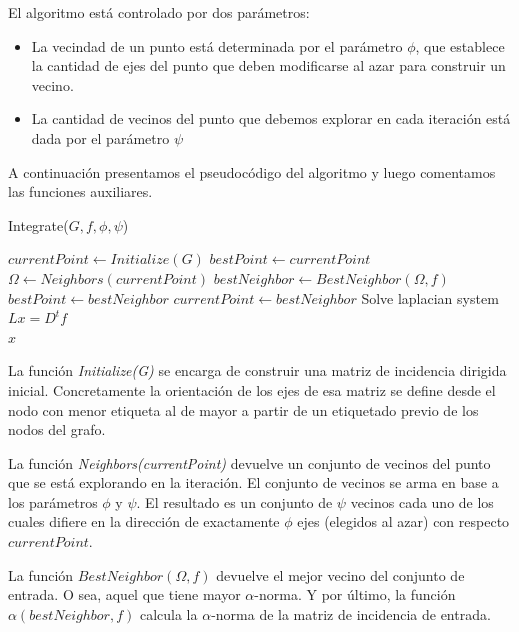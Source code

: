 \documentclass[conference,compsoc,a4paper]{IEEEtran}
\begin{document}
\smallskip

El algoritmo está controlado por dos parámetros:

\begin{itemize}
	\item La vecindad de un punto está determinada por el parámetro 
	$\phi$, que establece la cantidad de ejes del punto que deben 
	modificarse al azar para construir un vecino.
	\item La cantidad de vecinos del punto que debemos explorar en cada 
	iteración está dada por el parámetro $\psi$
\end{itemize}

A continuación presentamos el pseudocódigo del algoritmo y luego 
comentamos las funciones auxiliares.

\begin{algorithm}
    \caption{Integrate($G,f,\phi,\psi$)}
	\begin{algorithmic}
		\State $currentPoint \gets Initialize(G)$
		\State $bestPoint \gets currentPoint$
			\State $\Omega \gets Neighbors(currentPoint)$
			\State $bestNeighbor \gets BestNeighbor(\Omega,f)$
				\State $bestPoint \gets bestNeighbor$
			\EndIf
			\State $currentPoint \gets bestNeighbor$
		\EndWhile
		\State Solve laplacian system $L x = D^t f$ \\
		\Return $x$
	\end{algorithmic}
	\label{alg:alg1}
\end{algorithm}

La función \emph{Initialize(G)} se encarga de construir 
una matriz de incidencia dirigida inicial. Concretamente la orientación 
de los ejes de esa matriz se define desde el nodo con menor 
etiqueta al de mayor a partir de un etiquetado previo de los nodos del 
grafo. 

\smallskip

La función \emph{Neighbors(currentPoint)} devuelve un conjunto de 
vecinos del punto que se está explorando en la iteración. El conjunto 
de vecinos se arma en base a los parámetros $\phi$ y $\psi$. El 
resultado es un conjunto de $\psi$ vecinos cada uno de los cuales 
difiere en la dirección de exactamente $\phi$ ejes (elegidos al azar) 
con respecto $currentPoint$.

\smallskip

La función $BestNeighbor(\Omega,f)$ devuelve el mejor vecino del conjunto 
de entrada. O sea, aquel que tiene mayor $\alpha$-norma. Y por último, 
la función $\alpha(bestNeighbor,f)$ calcula la $\alpha$-norma de la matriz 
de incidencia de entrada.
\end{document}
